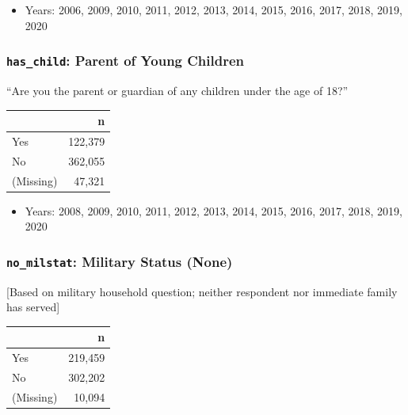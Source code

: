 \documentclass[10pt,article,oneside]{memoir}
\theoremstyle{definition}
\begin{document}
\begin{itemize}
\tightlist
\item
  Years: 2006, 2009, 2010, 2011, 2012, 2013, 2014, 2015, 2016, 2017,
  2018, 2019, 2020
\end{itemize}

\hypertarget{has_child-parent-of-young-children}{%
\subsubsection{\texorpdfstring{\texttt{has\_child}: Parent of Young
Children}{has\_child: Parent of Young Children}}\label{has_child-parent-of-young-children}}

``Are you the parent or guardian of any children under the age of 18?''

\begin{table}[H]
\centering
\begin{tabular}[t]{lr}
\toprule
 & n\\
\midrule
Yes & 122,379\\
No & 362,055\\
(Missing) & 47,321\\
\bottomrule
\end{tabular}
\end{table}

\begin{itemize}
\tightlist
\item
  Years: 2008, 2009, 2010, 2011, 2012, 2013, 2014, 2015, 2016, 2017,
  2018, 2019, 2020
\end{itemize}

\hypertarget{no_milstat-military-status-none}{%
\subsubsection{\texorpdfstring{\texttt{no\_milstat}: Military Status
(None)}{no\_milstat: Military Status (None)}}\label{no_milstat-military-status-none}}

{[}Based on military household question; neither respondent nor
immediate family has served{]}

\begin{table}[H]
\centering
\begin{tabular}[t]{lr}
\toprule
 & n\\
\midrule
Yes & 219,459\\
No & 302,202\\
(Missing) & 10,094\\
\bottomrule
\end{tabular}
\end{table}
\end{document}
